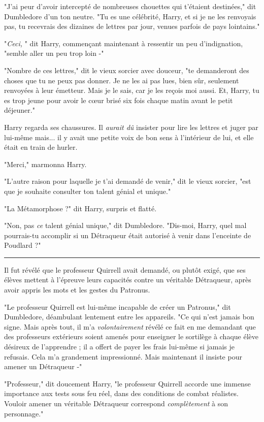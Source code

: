 "J'ai peur d'avoir intercepté de nombreuses chouettes qui t'étaient destinées," dit Dumbledore d'un ton neutre. "Tu es une célébrité, Harry, et si je ne les renvoyais pas, tu recevrais des dizaines de lettres par jour, venues parfois de pays lointains."

"\emph{Ceci,} " dit Harry, commençant maintenant à ressentir un peu d'indignation, "semble aller un peu trop loin -"

"Nombre de ces lettres," dit le vieux sorcier avec douceur, "te demanderont des choses que tu ne peux pas donner. Je ne les ai pas lues, bien sûr, seulement renvoyées à leur émetteur. Mais je le sais, car je les reçois moi aussi. Et, Harry, tu es trop jeune pour avoir le cœur brisé six fois chaque matin avant le petit déjeuner."

Harry regarda ses chaussures. Il \emph{aurait dû}  insister pour lire les lettres et juger par lui-même mais... il y avait une petite voix de bon sens à l'intérieur de lui, et elle était en train de hurler.

"Merci," marmonna Harry.

"L'autre raison pour laquelle je t'ai demandé de venir," dit le vieux sorcier, "est que je souhaite consulter ton talent génial et unique."

"La Métamorphose ?" dit Harry, surpris et flatté.

"Non, pas \emph{ce}  talent génial unique," dit Dumbledore. "Dis-moi, Harry, quel mal pourrais-tu accomplir si un Détraqueur était autorisé à venir dans l'enceinte de Poudlard ?"
\par\noindent\rule{\textwidth}{0.4pt}
Il fut révélé que le professeur Quirrell avait demandé, ou plutôt exigé, que ses élèves mettent à l'épreuve leurs capacités contre un véritable Détraqueur, après avoir appris les mots et les gestes du Patronus.

"Le professeur Quirrell est lui-même incapable de créer un Patronus," dit Dumbledore, déambulant lentement entre les appareils. "Ce qui n'est jamais bon signe. Mais après tout, il m'a \emph{volontairement } révélé ce fait en me demandant que des professeurs extérieurs soient amenés pour enseigner le sortilège à chaque élève désireux de l'apprendre ; il a offert de payer les frais lui-même si jamais je refusais. Cela m'a grandement impressionné. Mais maintenant il insiste pour amener un Détraqueur -"

"Professeur," dit doucement Harry, "le professeur Quirrell accorde une immense importance aux tests sous feu réel, dans des conditions de combat réalistes. Vouloir amener un véritable Détraqueur correspond \emph{complètement}  à son personnage."

